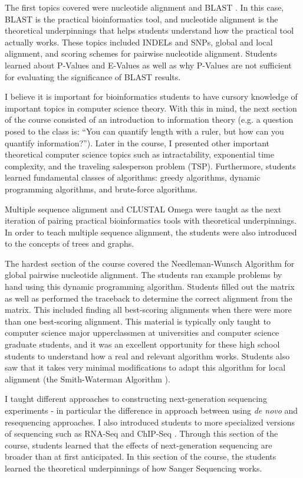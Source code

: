 \documentclass{report}
\begin{document}
The first topics covered were nucleotide alignment and BLAST  \cite{altschul1990basic}. In this case, BLAST is the practical bioinformatics tool, and nucleotide alignment is the theoretical underpinnings that helps students understand how the practical tool actually works. These topics included INDELs and SNPs, global and local alignment, and scoring schemes for pairwise nucleotide alignment. Students learned about P-Values and E-Values as well as why P-Values are not sufficient for evaluating the significance of BLAST results. 

I believe it is important for bioinformatics students to have cursory knowledge of important topics in computer science theory. With this in mind, the next section of the course consisted of an introduction to information theory (e.g. a question posed to the class is: ``You can quantify length with a ruler, but how can you quantify information?''). Later in the course, I presented other important theoretical computer science topics such as intractability, exponential time complexity, and the traveling salesperson problem (TSP). Furthermore, students learned fundamental classes of algorithms: greedy algorithms, dynamic programming algorithms, and brute-force algorithms. 

Multiple sequence alignment and CLUSTAL Omega \cite{sievers2011fast} were taught as the next iteration of pairing practical bioinformatics tools with theoretical underpinnings. In order to teach multiple sequence alignment, the students were also introduced to the concepts of trees and graphs.

The hardest section of the course covered the Needleman-Wunsch Algorithm \cite{needleman1970general} for global pairwise nucleotide alignment. The students ran example problems by hand using this dynamic programming algorithm. Students filled out the matrix as well as performed the traceback to determine the correct alignment from the matrix. This included finding all best-scoring alignments when there were more than one best-scoring alignment. This material is typically only taught to computer science major upperclassmen at universities and computer science graduate students, and it was an excellent opportunity for these high school students to understand how a real and relevant algorithm works. Students also saw that it takes very minimal modifications to adapt this algorithm for local alignment (the Smith-Waterman Algorithm \cite{smith1981identification}).

I taught different approaches to constructing next-generation sequencing experiments - in particular the difference in approach between using \emph{de novo} and resequencing approaches. I also introduced students to more specialized versions of sequencing such as RNA-Seq \cite{nagalakshmi2008transcriptional} and ChIP-Seq \cite{johnson2007genome}. Through this section of the course, students learned that the effects of next-generation sequencing are broader than at first anticipated. In this section of the course, the students learned the theoretical underpinnings of how Sanger Sequencing works.
\end{document}
